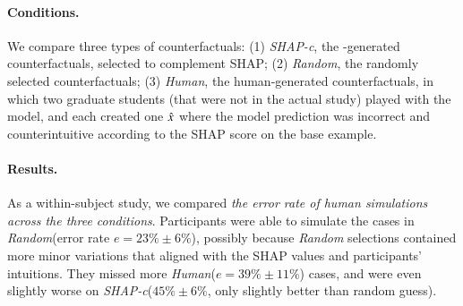 

\newcommand{\cshap}{\emph{SHAP-c}\xspace}
\newcommand{\crandom}{\emph{Random}\xspace}
\newcommand{\chuman}{\emph{Human}\xspace}
\paragraph{Conditions.} 
We compare three types of counterfactuals:
(1) \cshap, the \sysname-generated counterfactuals, selected to complement SHAP; 
(2) \crandom, the randomly selected \sysname counterfactuals; 
(3) \chuman, the human-generated counterfactuals, in which two graduate students (that were not in the actual study) played with the model, and each created one $\hat{x}$ where the model prediction was incorrect and counterintuitive according to the SHAP score on the base example.

\paragraph{Results.}
As a within-subject study, we compared \emph{the error rate of human simulations across the three conditions}.
Participants were able to simulate the cases in \crandom (error rate $e=23\%\pm6\%$), possibly because \crandom selections contained more minor variations that aligned with the SHAP values and participants' intuitions.
They missed more \chuman ($e=39\%\pm11\%$) cases, and were even slightly worse on \cshap ($45\%\pm 6\%$, only slightly better than random guess).%

